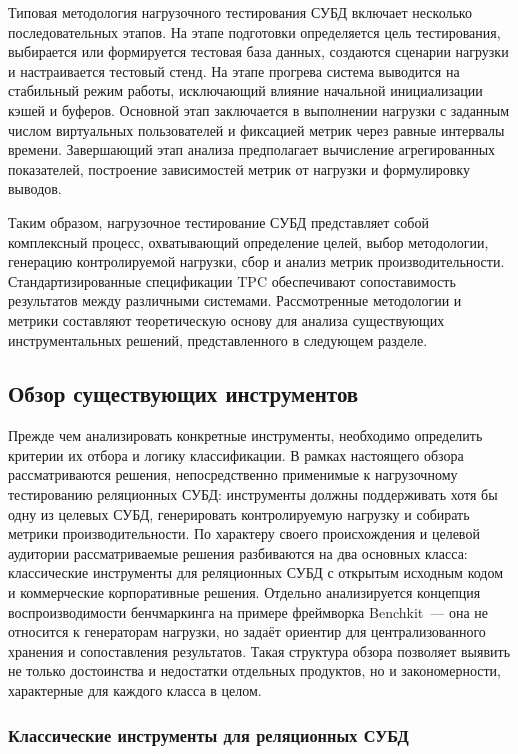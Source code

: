 Типовая методология нагрузочного тестирования СУБД включает несколько последовательных этапов. На этапе подготовки определяется цель тестирования, выбирается или формируется тестовая база данных, создаются сценарии нагрузки и настраивается тестовый стенд. На этапе прогрева система выводится на стабильный режим работы, исключающий влияние начальной инициализации кэшей и буферов. Основной этап заключается в выполнении нагрузки с заданным числом виртуальных пользователей и фиксацией метрик через равные интервалы времени. Завершающий этап анализа предполагает вычисление агрегированных показателей, построение зависимостей метрик от нагрузки и формулировку выводов.

Таким образом, нагрузочное тестирование СУБД представляет собой комплексный процесс, охватывающий определение целей, выбор методологии, генерацию контролируемой нагрузки, сбор и анализ метрик производительности. Стандартизированные спецификации TPC обеспечивают сопоставимость результатов между различными системами. Рассмотренные методологии и метрики составляют теоретическую основу для анализа существующих инструментальных решений, представленного в следующем разделе.

\subsection{Обзор существующих инструментов}

Прежде чем анализировать конкретные инструменты, необходимо определить критерии их отбора и логику классификации. В рамках настоящего обзора рассматриваются решения, непосредственно применимые к нагрузочному тестированию реляционных СУБД: инструменты должны поддерживать хотя бы одну из целевых СУБД, генерировать контролируемую нагрузку и собирать метрики производительности. По характеру своего происхождения и целевой аудитории рассматриваемые решения разбиваются на два основных класса: классические инструменты для реляционных СУБД с открытым исходным кодом и коммерческие корпоративные решения. Отдельно анализируется концепция воспроизводимости бенчмаркинга на примере фреймворка Benchkit~--- она не относится к генераторам нагрузки, но задаёт ориентир для централизованного хранения и сопоставления результатов. Такая структура обзора позволяет выявить не только достоинства и недостатки отдельных продуктов, но и закономерности, характерные для каждого класса в целом.

\subsubsection{Классические инструменты для реляционных СУБД}

